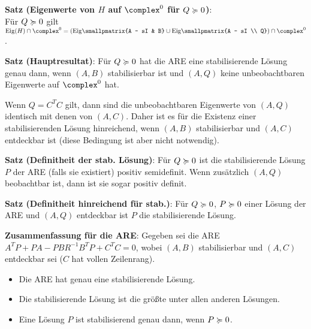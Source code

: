 \textbf{Satz (Eigenwerte von $H$ auf $\complex^0$ für $Q \succcurlyeq 0$)}:\\
Für $Q \succcurlyeq 0$ gilt
$\Eig(H) \cap \complex^0 = \left(\Eig\!\smallpmatrix{A - sI & B} \cup
\Eig\!\smallpmatrix{A - sI \\ Q}\right) \cap \complex^0$.

\linie

\textbf{Satz (Hauptresultat)}:
Für $Q \succcurlyeq 0$ hat die ARE eine stabilisierende Lösung genau dann,
wenn $(A, B)$ stabilisierbar ist und
$(A, Q)$ keine unbeobachtbaren Eigenwerte auf $\complex^0$ hat.

Wenn $Q = C^T C$ gilt, dann sind die unbeobachtbaren Eigenwerte von $(A, Q)$ identisch mit denen
von $(A, C)$.
Daher ist es für die Existenz einer stabilisierenden Lösung hinreichend,
wenn $(A, B)$ stabilisierbar und $(A, C)$ entdeckbar ist
(diese Bedingung ist aber nicht notwendig).

\linie

\textbf{Satz (Definitheit der stab. Lösung)}:
Für $Q \succcurlyeq 0$ ist die stabilisierende Lösung $P$ der ARE (falls sie existiert) positiv semidefinit.
Wenn zusätzlich $(A, Q)$ beobachtbar ist, dann ist sie sogar positiv definit.

\linie

\textbf{Satz (Definitheit hinreichend für stab.)}:
Für $Q \succcurlyeq 0$, $P \succcurlyeq 0$ einer Lösung der ARE und $(A, Q)$ entdeckbar ist $P$ die
stabilisierende Lösung.

\linie

\textbf{Zusammenfassung für die ARE}:
Gegeben sei die ARE $A^T P + PA - PBR^{-1} B^T P + C^T C = 0$,
wobei $(A, B)$ stabilisierbar und $(A, C)$ entdeckbar sei
($C$ hat vollen Zeilenrang).
\begin{itemize}
    \item
    Die ARE hat genau eine stabilisierende Lösung.

    \item
    Die stabilisierende Lösung ist die größte unter allen anderen Lösungen.

    \item
    Eine Lösung $P$ ist stabilisierend genau dann, wenn $P \succcurlyeq 0$.
\end{itemize}

\linie

